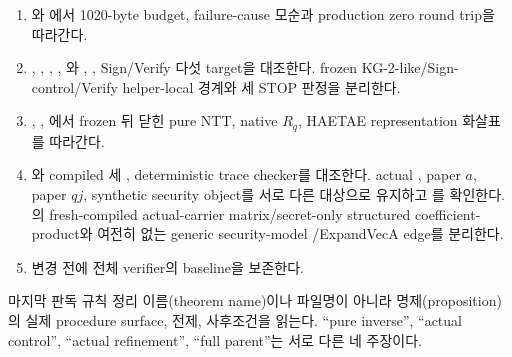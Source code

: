 \begin{enumerate}
        failure/success 합을 읽고,
        \newline
        focused harness와 production harness의 exact equivalence를 확인한다.
  \item {}\newline
        와
        에서 1020-byte budget,
        failure-cause 모순과 production zero round trip을 따라간다.
  \item {}\newline
        ,\newline
        ,\newline
        ,\newline
        ,\newline
        \allowbreak
        와\newline
        \allowbreak
        ,\newline
        \allowbreak
        , Sign/Verify 다섯 target을 대조한다.\newline
        frozen KG-2-like/Sign-control/Verify helper-local 경계와 세 STOP 판정을
        분리한다.
  \item {},
        ,
        에서 frozen 뒤 닫힌 pure NTT, native \(R_q\),
        HAETAE representation 화살표를 따라간다.
  \item {}와 compiled 세
        , deterministic trace checker를 대조한다.
        actual , paper \(a\), paper \(qj\), synthetic security
        object를 서로 다른 대상으로 유지하고 \CurrentGate 를 확인한다.
        의 fresh-compiled actual-carrier
        matrix/secret-only structured coefficient-product와 여전히 없는 generic security-model
        /ExpandVecA edge를 분리한다.
  \item 변경 전에 전체 verifier의 baseline을 보존한다.
\end{enumerate}

\begin{takeaway}{마지막 판독 규칙}
정리 이름(theorem name)이나 파일명이 아니라 명제(proposition)의 실제 procedure
surface, 전제,
사후조건을 읽는다. ``pure inverse'', ``actual control'', ``actual refinement'',
``full parent''는 서로 다른 네 주장이다.
\end{takeaway}

